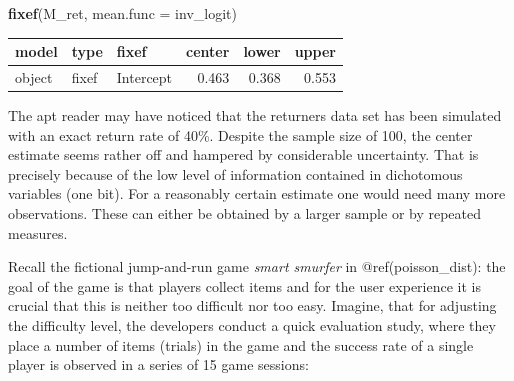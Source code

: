 \documentclass[]{svmono}
\newenvironment{Shaded}{\begin{snugshade}}{\end{snugshade}}
\newcommand{\KeywordTok}[1]{\textcolor[rgb]{0.13,0.29,0.53}{\textbf{#1}}}
\newcommand{\DataTypeTok}[1]{\textcolor[rgb]{0.13,0.29,0.53}{#1}}
\newcommand{\DecValTok}[1]{\textcolor[rgb]{0.00,0.00,0.81}{#1}}
\newcommand{\StringTok}[1]{\textcolor[rgb]{0.31,0.60,0.02}{#1}}
\newcommand{\OperatorTok}[1]{\textcolor[rgb]{0.81,0.36,0.00}{\textbf{#1}}}
\newcommand{\NormalTok}[1]{#1}
\theoremstyle{definition}
\theoremstyle{definition}
\theoremstyle{definition}
\theoremstyle{remark}
\begin{document}
\begin{Shaded}
\begin{Highlighting}[]
\KeywordTok{fixef}\NormalTok{(M_ret, }\DataTypeTok{mean.func =}\NormalTok{ inv_logit)}
\end{Highlighting}
\end{Shaded}

\begin{longtable}[]{@{}lllrrr@{}}
\toprule
model & type & fixef & center & lower & upper\tabularnewline
\midrule
\endhead
object & fixef & Intercept & 0.463 & 0.368 & 0.553\tabularnewline
\bottomrule
\end{longtable}

The apt reader may have noticed that the returners data set has been
simulated with an exact return rate of 40\%. Despite the sample size of
100, the center estimate seems rather off and hampered by considerable
uncertainty. That is precisely because of the low level of information
contained in dichotomous variables (one bit). For a reasonably certain
estimate one would need many more observations. These can either be
obtained by a larger sample or by repeated measures.

Recall the fictional jump-and-run game \emph{smart smurfer} in
@ref(poisson\_dist): the goal of the game is that players collect items
and for the user experience it is crucial that this is neither too
difficult nor too easy. Imagine, that for adjusting the difficulty
level, the developers conduct a quick evaluation study, where they place
a number of items (trials) in the game and the success rate of a single
player is observed in a series of 15 game sessions:

\begin{Shaded}
\end{Shaded}
\end{document}
